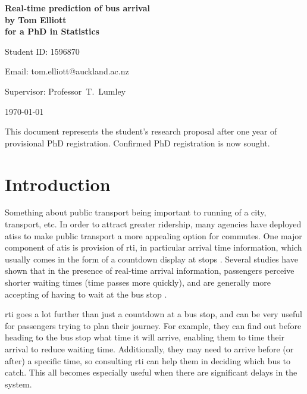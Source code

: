 \documentclass[12pt,a4paper]{article}
\begin{document}
\begin{Large}
\begin{center}
\textbf{Real-time prediction of bus arrival} \\
\textbf{by Tom Elliott} \\
\textbf{for a PhD in Statistics}
\end{center}
\end{Large}


\hfill{Student ID: 1596870}

\hfill{Email: tom.elliott@auckland.ac.nz}

Supervisor: Professor~T.~Lumley





\begin{center}
\today
\end{center}


This document represents the student's research proposal after
one year of provisional PhD registration.
Confirmed PhD registration is now sought.




\section{Introduction}
\label{sec:intro}

Something about public transport being important to running of a city, transport, etc.
In order to attract greater ridership, many agencies have deployed \glspl{atis}
to make public transport a more appealing option for commutes.
One major component of \gls{atis} is provision of \gls{rti}, 
in particular arrival time information, 
which usually comes in the form of a countdown display at stops
\citep{cn}.
Several studies have shown that in the presence of real-time arrival information, 
passengers perceive shorter waiting times (time passes more quickly), 
and are generally more accepting of having to wait at the bus stop
\citep{tcrp:2003}.


\gls{rti} goes a lot further than just a countdown at a bus stop,
and can be very useful for passengers trying to plan their journey.
For example, they can find out before heading to the bus stop what time it will arrive,
enabling them to time their arrival to reduce waiting time.
Additionally, they may need to arrive before (or after) a specific time,
so consulting \gls{rti} can help them in deciding which bus to catch.
This all becomes especially useful when there are significant delays in the system.
\end{document}
